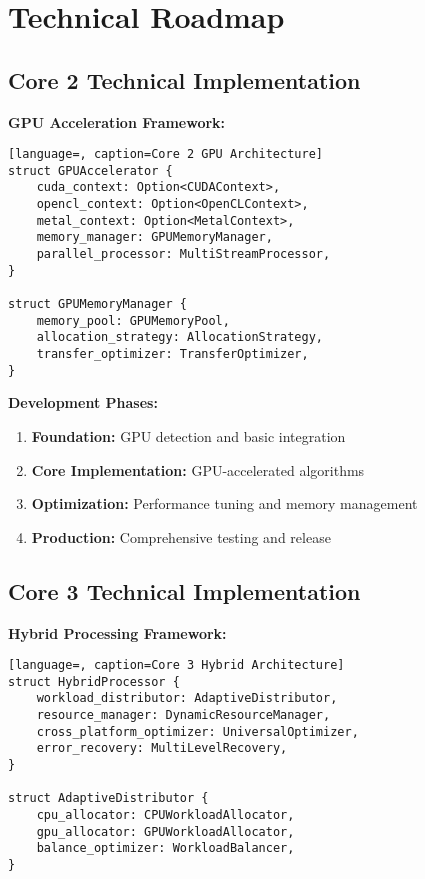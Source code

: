 \documentclass[12pt,a4paper]{article}
\begin{document}
\section{Technical Roadmap}

\subsection{Core 2 Technical Implementation}

\textbf{GPU Acceleration Framework:}
\begin{lstlisting}[language=, caption=Core 2 GPU Architecture]
struct GPUAccelerator {
    cuda_context: Option<CUDAContext>,
    opencl_context: Option<OpenCLContext>,
    metal_context: Option<MetalContext>,
    memory_manager: GPUMemoryManager,
    parallel_processor: MultiStreamProcessor,
}

struct GPUMemoryManager {
    memory_pool: GPUMemoryPool,
    allocation_strategy: AllocationStrategy,
    transfer_optimizer: TransferOptimizer,
}
\end{lstlisting}

\textbf{Development Phases:}
\begin{enumerate}
    \item \textbf{Foundation:} GPU detection and basic integration
    \item \textbf{Core Implementation:} GPU-accelerated algorithms
    \item \textbf{Optimization:} Performance tuning and memory management
    \item \textbf{Production:} Comprehensive testing and release
\end{enumerate}

\subsection{Core 3 Technical Implementation}

\textbf{Hybrid Processing Framework:}
\begin{lstlisting}[language=, caption=Core 3 Hybrid Architecture]
struct HybridProcessor {
    workload_distributor: AdaptiveDistributor,
    resource_manager: DynamicResourceManager,
    cross_platform_optimizer: UniversalOptimizer,
    error_recovery: MultiLevelRecovery,
}

struct AdaptiveDistributor {
    cpu_allocator: CPUWorkloadAllocator,
    gpu_allocator: GPUWorkloadAllocator,
    balance_optimizer: WorkloadBalancer,
}
\end{lstlisting}
\end{document}
